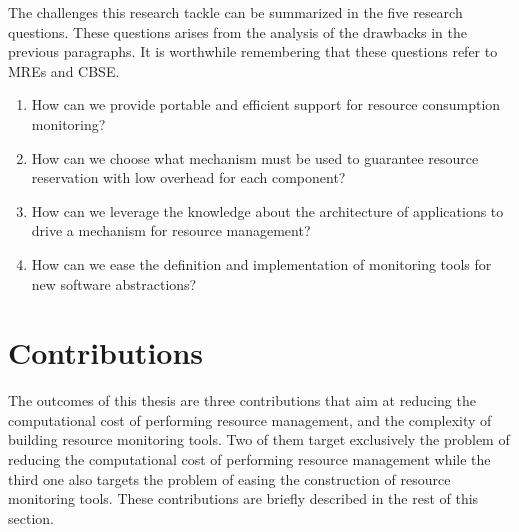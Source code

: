 The challenges this research tackle can be summarized in the five research questions.
These questions arises from the analysis of the drawbacks in the previous paragraphs.
It is worthwhile remembering that these questions refer to MREs and CBSE.

\begin{enumerate}
\renewcommand{\theenumi}{\textit{RQ\arabic{enumi}}}

\item How can we provide portable and efficient support for resource consumption monitoring?

\item How can we choose what mechanism must be used to guarantee resource reservation with low overhead for each component?
\begin{comment}
\item How can we improve resource management efficiency by relying on the fact that many applications are built on top of component models?
\end{comment}

\item How can we leverage the knowledge about the architecture of applications to drive a mechanism for resource management?

\item How can we ease the definition and implementation of monitoring tools for new software abstractions?
\end{enumerate}
 
\section{Contributions}

The outcomes of this thesis are three contributions that aim at reducing the computational cost of performing resource management, and the complexity of building resource monitoring tools.
Two of them target exclusively the problem of reducing the computational cost of performing resource management while the third one also targets the problem of easing the construction of resource monitoring tools. 
These contributions are briefly described in the rest of this section.

